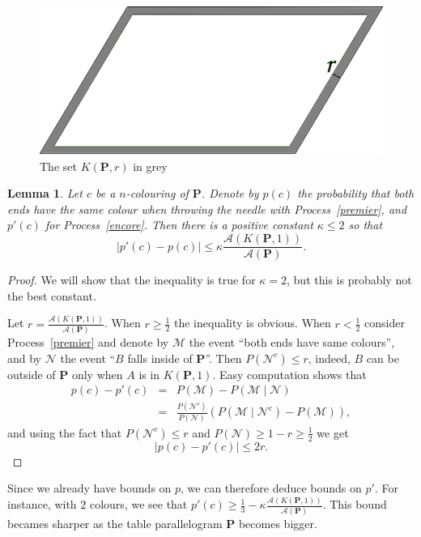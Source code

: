 \documentclass[a4paper,11pt]{article}
\newtheorem{lemma}{Lemma}
\theoremstyle{definition}
\theoremstyle{remark}
\begin{document}
\begin{figure}[h]
\center
\includegraphics[scale=0.5]{tablefinie.png}
\caption{\label{tablefinie} The set $K(\mathbf{P},r)$ in grey}
\end{figure}

\begin{lemma}
Let $c$ be a $n$-colouring of $\mathbf{P}$. Denote by $p(c)$ the probability 
that both ends have the same colour when throwing 
the needle with Process~\ref{premier}, and $p'(c)$ for Process~\ref{encore}. Then 
there is a positive constant $\kappa \leq 2$ so that 
$$ | p'(c) - p(c)| \leq \kappa \frac{\mathcal{A}(K(\mathbf{P},1))}{\mathcal{A}(\mathbf{P})}.$$
\end{lemma}

\begin{proof}
We will show that the inequality is true for $\kappa =2$, but this is probably 
not the best constant.

Let $r = \frac{\mathcal{A}(K(\mathbf{P},1))}{\mathcal{A}(\mathbf{P})}$. When 
$r \geq \frac12$ the inequality is obvious. When $r < \frac12$ consider 
Process~\ref{premier} and denote by $\mathcal{M}$ the event ``both ends have same 
colours'', and by $\mathcal{N}$ the event ``$B$ falls inside of $\mathbf{P}$''. 
Then $P(\mathcal{N}^c) \leq r$, indeed, $B$ can be outside of $\mathbf{P}$ only
when $A$ is in $K(\mathbf{P},1)$. Easy computation shows that
\begin{eqnarray*}
p(c) - p'(c) & = & P(\mathcal{M}) - P(\mathcal{M} \mid \mathcal{N}) \\
& = & \frac{P(\mathcal{N}^c)}{P(\mathcal{N})} \left( P(\mathcal{M}\mid \mathcal{N}^c) - P(\mathcal{M})\right),
\end{eqnarray*}
and using the fact that $P(\mathcal{N}^c) \leq r$ and $P(\mathcal{N}) \geq 1-r \geq \frac12$ we get 
$$ |p(c) - p'(c)| \leq 2r.$$
\end{proof}

Since we already have bounds on $p$, we can therefore deduce bounds on $p'$.
For instance, with $2$ colours, we see that 
$p'(c) \geq \frac13 - \kappa \frac{\mathcal{A}(K(\mathbf{P},1))}{\mathcal{A}(\mathbf{P})}$. 
This bound becames sharper as the table parallelogram $\mathbf{P}$ becomes bigger.
\end{document}
